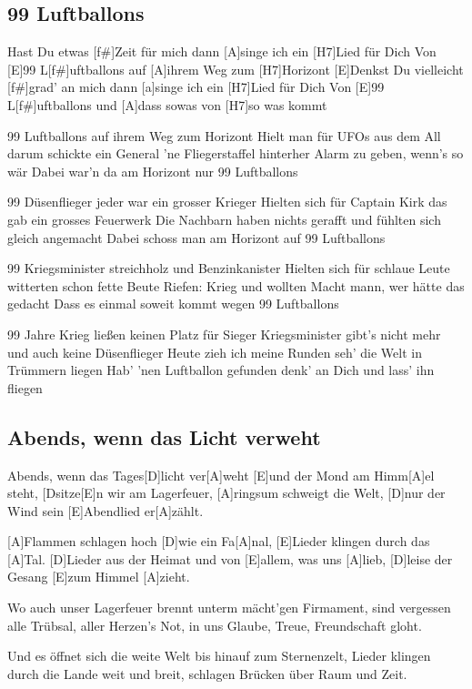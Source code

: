 \documentclass[10pt,a5paper,twoside]{scrbook}
\begin{document}
\subsection{99 Luftballons}
\begin{guitar}
[E]Hast Du etwas [f#]Zeit für mich dann [A]singe ich ein [H7]Lied für Dich
Von [E]99 L[f#]uftballons auf [A]ihrem Weg zum [H7]Horizont
[E]Denkst Du vielleicht [f#]grad' an mich dann [a]singe ich ein [H7]Lied für Dich
Von [E]99 L[f#]uftballons und [A]dass sowas von [H7]so was kommt

99 Luftballons auf ihrem Weg zum Horizont
Hielt man für UFOs aus dem All darum schickte ein General
'ne Fliegerstaffel hinterher Alarm zu geben, wenn's so wär
Dabei war'n da am Horizont nur 99 Luftballons

99 Düsenflieger jeder war ein grosser Krieger
Hielten sich für Captain Kirk das gab ein grosses Feuerwerk
Die Nachbarn haben nichts gerafft und fühlten sich gleich angemacht
Dabei schoss man am Horizont auf 99 Luftballons

99 Kriegsminister streichholz und Benzinkanister
Hielten sich für schlaue Leute witterten schon fette Beute
Riefen: Krieg und wollten Macht mann, wer hätte das gedacht
Dass es einmal soweit kommt wegen 99 Luftballons

99 Jahre Krieg ließen keinen Platz für Sieger
Kriegsminister gibt's nicht mehr und auch keine Düsenflieger
Heute zieh ich meine Runden seh' die Welt in Trümmern liegen
Hab' 'nen Luftballon gefunden denk' an Dich und lass' ihn fliegen
\end{guitar}

  	  
\newpage  

  	
\subsection{Abends, wenn das Licht verweht}

\begin{guitar}
[A]Abends, wenn das Tages[D]licht ver[A]weht
[E]und der Mond am Himm[A]el steht,
[Dsitze[E]n wir am Lagerfeuer, [A]ringsum schweigt die Welt,
[D]nur der Wind sein [E]Abendlied er[A]zählt.

[A]Flammen schlagen hoch [D]wie ein Fa[A]nal,
[E]Lieder klingen durch das [A]Tal.
[D]Lieder aus der Heimat und von [E]allem, was uns [A]lieb,
[D]leise der Gesang [E]zum Himmel [A]zieht.

Wo auch unser Lagerfeuer brennt
unterm mächt’gen Firmament,
sind vergessen alle Trübsal, aller Herzen’s Not, 
in uns Glaube, Treue, Freundschaft gloht.

Und es öffnet sich die weite Welt
bis hinauf zum Sternenzelt,
Lieder klingen durch die Lande weit und breit,
schlagen Brücken über Raum und Zeit.
\end{guitar}
\end{document}
